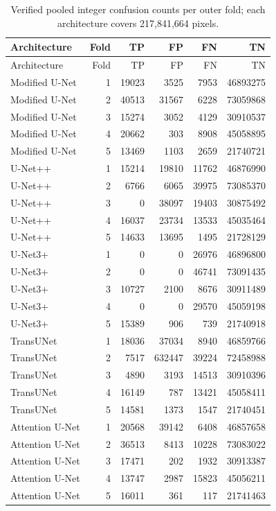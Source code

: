\small
\begin{longtable}{lrrrrr}
\caption{Verified pooled integer confusion counts per outer fold; each architecture covers 217,841,664 pixels.}\\
\toprule
Architecture & Fold & TP & FP & FN & TN\\\midrule
\endfirsthead
\toprule
Architecture & Fold & TP & FP & FN & TN\\\midrule
\endhead
Modified U-Net & 1 & 19023 & 3525 & 7953 & 46893275\\
Modified U-Net & 2 & 40513 & 31567 & 6228 & 73059868\\
Modified U-Net & 3 & 15274 & 3052 & 4129 & 30910537\\
Modified U-Net & 4 & 20662 & 303 & 8908 & 45058895\\
Modified U-Net & 5 & 13469 & 1103 & 2659 & 21740721\\
U-Net++ & 1 & 15214 & 19810 & 11762 & 46876990\\
U-Net++ & 2 & 6766 & 6065 & 39975 & 73085370\\
U-Net++ & 3 & 0 & 38097 & 19403 & 30875492\\
U-Net++ & 4 & 16037 & 23734 & 13533 & 45035464\\
U-Net++ & 5 & 14633 & 13695 & 1495 & 21728129\\
U-Net3+ & 1 & 0 & 0 & 26976 & 46896800\\
U-Net3+ & 2 & 0 & 0 & 46741 & 73091435\\
U-Net3+ & 3 & 10727 & 2100 & 8676 & 30911489\\
U-Net3+ & 4 & 0 & 0 & 29570 & 45059198\\
U-Net3+ & 5 & 15389 & 906 & 739 & 21740918\\
TransUNet & 1 & 18036 & 37034 & 8940 & 46859766\\
TransUNet & 2 & 7517 & 632447 & 39224 & 72458988\\
TransUNet & 3 & 4890 & 3193 & 14513 & 30910396\\
TransUNet & 4 & 16149 & 787 & 13421 & 45058411\\
TransUNet & 5 & 14581 & 1373 & 1547 & 21740451\\
Attention U-Net & 1 & 20568 & 39142 & 6408 & 46857658\\
Attention U-Net & 2 & 36513 & 8413 & 10228 & 73083022\\
Attention U-Net & 3 & 17471 & 202 & 1932 & 30913387\\
Attention U-Net & 4 & 13747 & 2987 & 15823 & 45056211\\
Attention U-Net & 5 & 16011 & 361 & 117 & 21741463\\
\bottomrule\end{longtable}\normalsize
